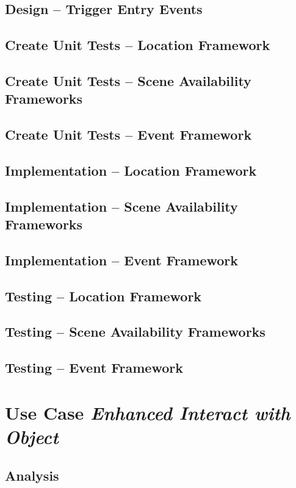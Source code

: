 \documentclass[11pt]{article}
\begin{document}
\subsection{Design -- Trigger Entry Events}
\label{sec:orge9cbebd}
\subsection{Create Unit Tests -- Location Framework}
\label{sec:orga7e4c7d}
\subsection{Create Unit Tests -- Scene Availability Frameworks}
\label{sec:org59a8e8b}
\subsection{Create Unit Tests -- Event Framework}
\label{sec:org9f6766b}
\subsection{Implementation -- Location Framework}
\label{sec:orgf6813aa}
\subsection{Implementation -- Scene Availability Frameworks}
\label{sec:orgc55acfd}
\subsection{Implementation -- Event Framework}
\label{sec:org8f90c26}
\subsection{Testing -- Location Framework}
\label{sec:org707561d}
\subsection{Testing -- Scene Availability Frameworks}
\label{sec:orgd91beea}
\subsection{Testing -- Event Framework}
\label{sec:orgacbe70b}
\section{Use Case \emph{Enhanced Interact with Object}}
\label{sec:orgc233c41}
\subsection{Analysis}
\label{sec:orgb9fa58d}
\end{document}
